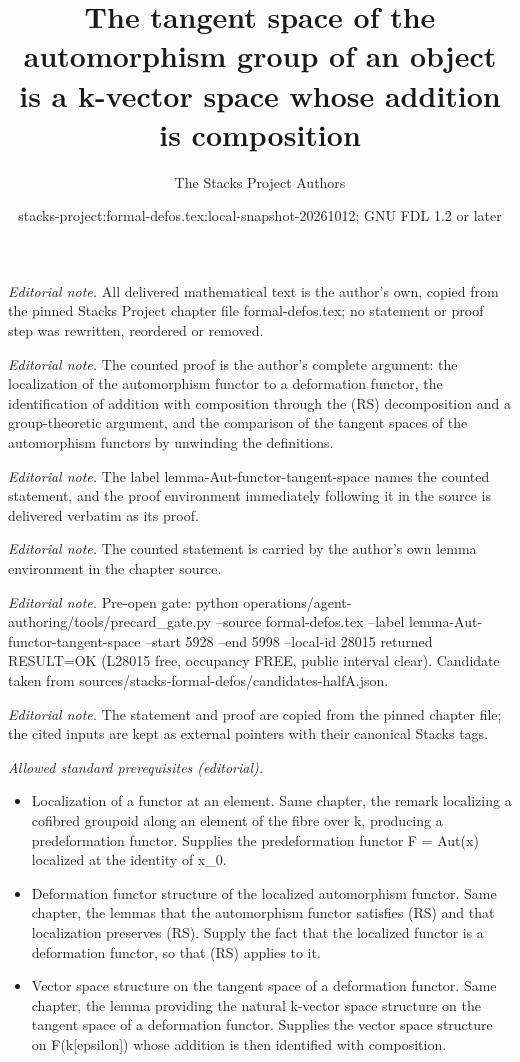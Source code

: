 \documentclass[10pt,a4paper]{amsart}
\title{The tangent space of the automorphism group of an object is a k-vector space whose addition is composition}
\author{The Stacks Project Authors}
\date{stacks-project:formal-defos.tex:local-snapshot-20261012; GNU FDL 1.2 or later}
\theoremstyle{plain}
\theoremstyle{definition}
\theoremstyle{remark}
\numberwithin{equation}{subsection}
\begin{document}
\maketitle
\noindent\textit{Editorial note.} All delivered mathematical text is the author's own, copied from the pinned Stacks Project chapter file formal-defos.tex; no statement or proof step was rewritten, reordered or removed.\par\medskip
\noindent\textit{Editorial note.} The counted proof is the author's complete argument: the localization of the automorphism functor to a deformation functor, the identification of addition with composition through the (RS) decomposition and a group-theoretic argument, and the comparison of the tangent spaces of the automorphism functors by unwinding the definitions.\par\medskip
\noindent\textit{Editorial note.} The label lemma-Aut-functor-tangent-space names the counted statement, and the proof environment immediately following it in the source is delivered verbatim as its proof.\par\medskip
\noindent\textit{Editorial note.} The counted statement is carried by the author's own lemma environment in the chapter source.\par\medskip
\noindent\textit{Editorial note.} Pre-open gate: python operations/agent-authoring/tools/precard\_gate.py --source formal-defos.tex --label lemma-Aut-functor-tangent-space --start 5928 --end 5998 --local-id 28015 returned RESULT=OK (L28015 free, occupancy FREE, public interval clear). Candidate taken from sources/stacks-formal-defos/candidates-halfA.json.\par\medskip
\noindent\textit{Editorial note.} The statement and proof are copied from the pinned chapter file; the cited inputs are kept as external pointers with their canonical Stacks tags.\par\medskip
\noindent\textit{Allowed standard prerequisites (editorial).}\begin{itemize}
\item Localization of a functor at an element. Same chapter, the remark localizing a cofibred groupoid along an element of the fibre over k, producing a predeformation functor. Supplies the predeformation functor F = Aut(x) localized at the identity of x\_0.
\item Deformation functor structure of the localized automorphism functor. Same chapter, the lemmas that the automorphism functor satisfies (RS) and that localization preserves (RS). Supply the fact that the localized functor is a deformation functor, so that (RS) applies to it.
\item Vector space structure on the tangent space of a deformation functor. Same chapter, the lemma providing the natural k-vector space structure on the tangent space of a deformation functor. Supplies the vector space structure on F(k[epsilon]) whose addition is then identified with composition.
\end{itemize}\medskip
\end{document}
